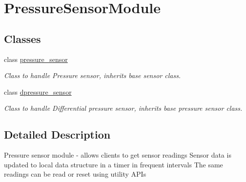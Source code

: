 \hypertarget{group___pressure_sensor_module}{}\section{Pressure\+Sensor\+Module}
\label{group___pressure_sensor_module}
\subsection*{Classes}
\begin{DoxyCompactItemize}
\item 
class \hyperlink{classpressure__sensor}{pressure\+\_\+sensor}
\begin{DoxyCompactList}\small\item\em Class to handle Pressure sensor, inherits base sensor class. \end{DoxyCompactList}\item 
class \hyperlink{classdpressure__sensor}{dpressure\+\_\+sensor}
\begin{DoxyCompactList}\small\item\em Class to handle Differential pressure sensor, inherits base pressure sensor class. \end{DoxyCompactList}\end{DoxyCompactItemize}


\subsection{Detailed Description}
Pressure sensor module -\/ allows clients to get sensor readings Sensor data is updated to local data structure in a timer in frequent intervals The same readings can be read or reset using utility A\+P\+Is 